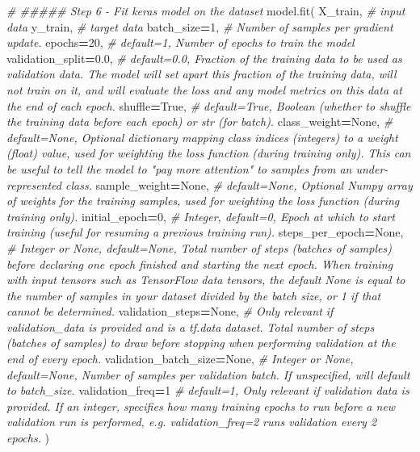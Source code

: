 \documentclass[
  a4paper,
  DIV=11,
  numbers=noendperiod]{scrreprt}
\newenvironment{Shaded}{\begin{snugshade}}{\end{snugshade}}
\newcommand{\CommentTok}[1]{\textcolor[rgb]{0.56,0.35,0.01}{\textit{#1}}}
\newcommand{\DecValTok}[1]{\textcolor[rgb]{0.00,0.00,0.81}{#1}}
\newcommand{\FloatTok}[1]{\textcolor[rgb]{0.00,0.00,0.81}{#1}}
\newcommand{\NormalTok}[1]{#1}
\newcommand{\OperatorTok}[1]{\textcolor[rgb]{0.81,0.36,0.00}{\textbf{#1}}}
\newcommand{\VariableTok}[1]{\textcolor[rgb]{0.00,0.00,0.00}{#1}}
\begin{document}
\begin{Shaded}
\begin{Highlighting}[numbers=left,,]
\CommentTok{\# \#\#\#\#\# Step 6 {-} Fit keras model on the dataset}
\NormalTok{model.fit(}
\NormalTok{    X\_train, }\CommentTok{\# input data}
\NormalTok{    y\_train, }\CommentTok{\# target data}
\NormalTok{    batch\_size}\OperatorTok{=}\DecValTok{1}\NormalTok{, }\CommentTok{\# Number of samples per gradient update.}
\NormalTok{    epochs}\OperatorTok{=}\DecValTok{20}\NormalTok{, }\CommentTok{\# default=1, Number of epochs to train the model}
\NormalTok{    validation\_split}\OperatorTok{=}\FloatTok{0.0}\NormalTok{, }\CommentTok{\# default=0.0, Fraction of the training data to be used as validation data. The model will set apart this fraction of the training data, will not train on it, and will evaluate the loss and any model metrics on this data at the end of each epoch.}
\NormalTok{    shuffle}\OperatorTok{=}\VariableTok{True}\NormalTok{, }\CommentTok{\# default=True, Boolean (whether to shuffle the training data before each epoch) or str (for \textquotesingle{}batch\textquotesingle{}).}
\NormalTok{    class\_weight}\OperatorTok{=}\VariableTok{None}\NormalTok{, }\CommentTok{\# default=None, Optional dictionary mapping class indices (integers) to a weight (float) value, used for weighting the loss function (during training only). This can be useful to tell the model to "pay more attention" to samples from an under{-}represented class.}
\NormalTok{    sample\_weight}\OperatorTok{=}\VariableTok{None}\NormalTok{, }\CommentTok{\# default=None, Optional Numpy array of weights for the training samples, used for weighting the loss function (during training only).}
\NormalTok{    initial\_epoch}\OperatorTok{=}\DecValTok{0}\NormalTok{, }\CommentTok{\# Integer, default=0, Epoch at which to start training (useful for resuming a previous training run).}
\NormalTok{    steps\_per\_epoch}\OperatorTok{=}\VariableTok{None}\NormalTok{, }\CommentTok{\# Integer or None, default=None, Total number of steps (batches of samples) before declaring one epoch finished and starting the next epoch. When training with input tensors such as TensorFlow data tensors, the default None is equal to the number of samples in your dataset divided by the batch size, or 1 if that cannot be determined.}
\NormalTok{    validation\_steps}\OperatorTok{=}\VariableTok{None}\NormalTok{, }\CommentTok{\# Only relevant if validation\_data is provided and is a tf.data dataset. Total number of steps (batches of samples) to draw before stopping when performing validation at the end of every epoch.}
\NormalTok{    validation\_batch\_size}\OperatorTok{=}\VariableTok{None}\NormalTok{, }\CommentTok{\# Integer or None, default=None, Number of samples per validation batch. If unspecified, will default to batch\_size.}
\NormalTok{    validation\_freq}\OperatorTok{=}\DecValTok{1} \CommentTok{\# default=1, Only relevant if validation data is provided. If an integer, specifies how many training epochs to run before a new validation run is performed, e.g. validation\_freq=2 runs validation every 2 epochs.}
\NormalTok{    )}



\end{Highlighting}
\end{Shaded}
\end{document}
